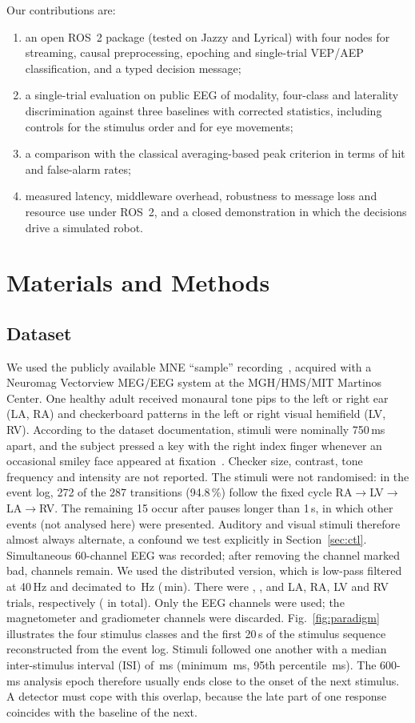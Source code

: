 \documentclass[conference]{IEEEtran}
\begin{document}
Our contributions are:
\begin{enumerate}
\item an open ROS~2 package (tested on Jazzy and Lyrical) with four nodes for streaming, causal preprocessing, epoching and single-trial VEP/AEP classification, and a typed decision message;
\item a single-trial evaluation on public EEG of modality, four-class and laterality discrimination against three baselines with corrected statistics, including controls for the stimulus order and for eye movements;
\item a comparison with the classical averaging-based peak criterion in terms of hit and false-alarm rates;
\item measured latency, middleware overhead, robustness to message loss and resource use under ROS~2, and a closed demonstration in which the decisions drive a simulated robot.
\end{enumerate}

\section{Materials and Methods}

\subsection{Dataset}
We used the publicly available MNE ``sample'' recording~\cite{gramfort2013mne}, acquired with a Neuromag Vectorview MEG/EEG system at the MGH/HMS/MIT Martinos Center. One healthy adult received monaural tone pips to the left or right ear (LA, RA) and checkerboard patterns in the left or right visual hemifield (LV, RV). According to the dataset documentation, stimuli were nominally 750\,ms apart, and the subject pressed a key with the right index finger whenever an occasional smiley face appeared at fixation~\cite{gramfort2013mne}. Checker size, contrast, tone frequency and intensity are not reported. The stimuli were not randomised: in the event log, 272 of the 287 transitions (94.8\,\%) follow the fixed cycle RA$\rightarrow$LV$\rightarrow$LA$\rightarrow$RV. The remaining 15 occur after pauses longer than 1\,s, in which other events (not analysed here) were presented. Auditory and visual stimuli therefore almost always alternate, a confound we test explicitly in Section~\ref{sec:ctl}. Simultaneous 60-channel EEG was recorded; after removing the channel marked bad, \Nch{} channels remain. We used the distributed version, which is low-pass filtered at 40\,Hz and decimated to \Fs\,Hz (\Dur\,min). There were \NLA, \NRA, \NLV{} and \NRV{} LA, RA, LV and RV trials, respectively (\Ntrials{} in total). Only the EEG channels were used; the magnetometer and gradiometer channels were discarded. Fig.~\ref{fig:paradigm} illustrates the four stimulus classes and the first 20\,s of the stimulus sequence reconstructed from the event log. Stimuli followed one another with a median inter-stimulus interval (ISI) of \ISImed\,ms (minimum \ISImin\,ms, 95th percentile \ISImax\,ms). The 600-ms analysis epoch therefore usually ends close to the onset of the next stimulus. A detector must cope with this overlap, because the late part of one response coincides with the baseline of the next.
\end{document}
